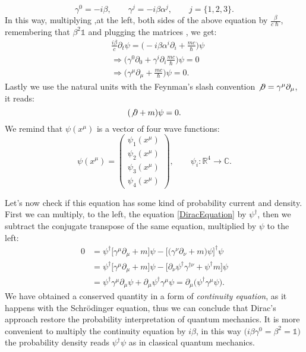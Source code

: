 \begin{equation}\label{DiracMatrixG}
    \gamma^0=-i\beta,\qquad \gamma^j=-i\beta\alpha^j,\qquad j=\{1,2,3\}.
\end{equation}
In this way, multiplying ,at the left, both sides of the above equation by $\frac{\beta}{c\hslash}$, remembering that $\beta^2\mathds{1}$ and plugging the matrices , we get:
\begin{align*}
    &\frac{i\beta}{c}\partial_t\psi=\bigg(-i\beta\alpha^i\partial_i+\frac{mc}{\hslash}\bigg)\psi\\&\Rightarrow\bigg(\gamma^0\partial_0+\gamma^i\partial_i\frac{mc}{\hslash}\bigg)\psi=0
    \\&\Rightarrow\bigg(\gamma^\mu\partial_\mu+\frac{mc}{\hslash}\bigg)\psi=0.
\end{align*}
Lastly we use the natural units with the Feynman's slash convention $\not\partial= \gamma^\mu\partial_\mu$, it reads:
\begin{equation}
    \label{DiracEquation}(\not\partial+m)\psi=0.
\end{equation}
We remind that $\psi(x^\mu)$ is a vector of four wave functions:
\begin{equation*}
    \psi(x^\mu)=\begin{pmatrix}
    \psi_1(x^\mu)\\\psi_2(x^\mu)\\\psi_3(x^\mu)\\\psi_4(x^\mu)
    \end{pmatrix}, \qquad \psi_i:\mathbb{R}^4\rightarrow\mathbb{C}. 
\end{equation*}

Let's now check if this equation has some kind of probability current and density. First we can multiply, to the left, the equation \eqref{DiracEquation} by $\psi^\dagger$, then we subtract the conjugate transpose of the same equation, multiplied by $\psi$ to the left:
\begin{align*}
    0&=\psi^\dagger\big[\gamma^\mu\partial_\mu+m\big]\psi-\big[\big(\gamma^\nu\partial_\nu+m\big)\psi\big]^\dagger\psi\\
    &=\psi^\dagger\big[\gamma^\mu\partial_\mu+m\big]\psi-\big[\partial_\nu\psi^\dagger\gamma^{\dagger\nu}+\psi^\dagger m\big]\psi\\
    &=\psi^\dagger\gamma^\mu\partial_\mu\psi+\partial_\mu\psi^\dagger\gamma^\mu\psi=\partial_\mu\big(\psi^\dagger\gamma^\mu\psi\big).
\end{align*}  
We have obtained a conserved quantity in a form of \emph{continuity equation}, as it happens with the Schrödinger equation, thus we can conclude that Dirac's approach restore the probability interpretation of quantum mechanics. It is more convenient to multiply the continuity equation by $i\beta$, in this way $\big(i\beta\gamma^0=\beta^2=\mathds{1}\big)$ the probability density reads $\psi^\dagger\psi$ as in classical quantum mechanics.

